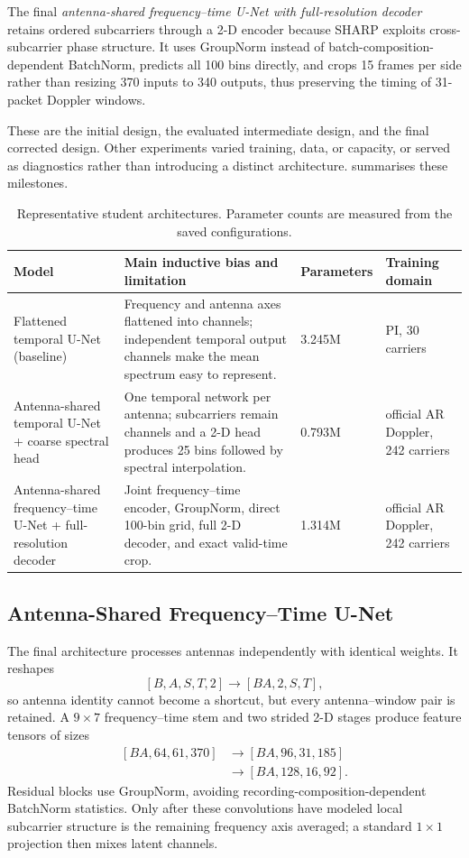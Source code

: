The final \emph{antenna-shared frequency--time U-Net with full-resolution
decoder} retains ordered subcarriers through a 2-D encoder because SHARP
exploits cross-subcarrier phase structure. It uses GroupNorm instead of
batch-composition-dependent BatchNorm, predicts all 100 bins directly, and
crops 15 frames per side rather than resizing 370 inputs to 340 outputs, thus
preserving the timing of 31-packet Doppler windows.

These are the initial design, the evaluated intermediate design, and the final
corrected design. Other experiments varied training, data, or capacity, or
served as diagnostics rather than introducing a distinct architecture.
 summarises these milestones.

\begin{table}[t]
\centering
\caption{Representative student architectures. Parameter counts are measured
from the saved configurations.}
\label{tab:models}
\footnotesize
\setlength{\tabcolsep}{4pt}
\begin{tabular}{@{}p{}p{}p{}p{}@{}}
\hline
Model & Main inductive bias and limitation & Parameters & Training domain \\
\hline
Flattened temporal U-Net (baseline) &
Frequency and antenna axes flattened into channels; independent temporal
output channels make the mean spectrum easy to represent. &
3.245M & PI, 30 carriers \\
Antenna-shared temporal U-Net + coarse spectral head &
One temporal network per antenna; subcarriers remain channels and a 2-D head
produces 25 bins followed by spectral interpolation. &
0.793M & official AR Doppler, 242 carriers \\
Antenna-shared frequency--time U-Net + full-resolution decoder &
Joint frequency--time encoder, GroupNorm, direct 100-bin grid, full 2-D
decoder, and exact valid-time crop. &
1.314M & official AR Doppler, 242 carriers \\
\hline
\end{tabular}
\end{table}

\subsection{Antenna-Shared Frequency--Time U-Net}

The final architecture processes antennas independently with identical weights.
It reshapes
\[
[B,A,S,T,2]\rightarrow[BA,2,S,T],
\]
so antenna identity cannot become a shortcut, but every antenna--window pair is
retained. A \(9\times7\) frequency--time stem and two strided 2-D stages produce
feature tensors of sizes
\[
\begin{split}
[BA,64,61,370]&\rightarrow[BA,96,31,185]\\
&\rightarrow[BA,128,16,92].
\end{split}
\]
Residual blocks use GroupNorm, avoiding recording-composition-dependent
BatchNorm statistics. Only after these convolutions have modeled local
subcarrier structure is the remaining frequency axis averaged; a standard
\(1\times1\) projection then mixes latent channels.

